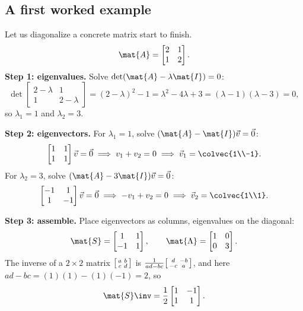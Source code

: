 \subsection{A first worked example}
\label{ch24:first-example}

Let us diagonalize a concrete matrix start to finish.
\[
  \mat{A} = \begin{bmatrix} 2 & 1 \\ 1 & 2 \end{bmatrix}.
\]
\textbf{Step 1: eigenvalues.} Solve $\det(\mat{A} - \lambda\mat{I}) = 0$:
\[
  \det\begin{bmatrix} 2-\lambda & 1 \\ 1 & 2-\lambda \end{bmatrix}
  = (2-\lambda)^2 - 1
  = \lambda^2 - 4\lambda + 3
  = (\lambda - 1)(\lambda - 3) = 0,
\]
so $\lambda_1 = 1$ and $\lambda_2 = 3$.

\textbf{Step 2: eigenvectors.} For $\lambda_1 = 1$, solve $(\mat{A}-\mat{I})\vec{v}=\vec0$:
\[
  \begin{bmatrix} 1 & 1 \\ 1 & 1 \end{bmatrix}\vec{v} = \vec0
  \;\Longrightarrow\; v_1 + v_2 = 0
  \;\Longrightarrow\; \vec{v}_1 = \colvec{1\\-1}.
\]
For $\lambda_2 = 3$, solve $(\mat{A}-3\mat{I})\vec{v}=\vec0$:
\[
  \begin{bmatrix} -1 & 1 \\ 1 & -1 \end{bmatrix}\vec{v} = \vec0
  \;\Longrightarrow\; -v_1 + v_2 = 0
  \;\Longrightarrow\; \vec{v}_2 = \colvec{1\\1}.
\]

\textbf{Step 3: assemble.} Place eigenvectors as columns, eigenvalues on the diagonal:
\[
  \mat{S} = \begin{bmatrix} 1 & 1 \\ -1 & 1 \end{bmatrix},
  \qquad
  \mat{\Lambda} = \begin{bmatrix} 1 & 0 \\ 0 & 3 \end{bmatrix}.
\]
The inverse of a $2\times2$ matrix $\begin{bsmallmatrix} a&b\\c&d\end{bsmallmatrix}$
is $\frac{1}{ad-bc}\begin{bsmallmatrix} d&-b\\-c&a\end{bsmallmatrix}$, and here
$ad-bc = (1)(1)-(1)(-1) = 2$, so
\[
  \mat{S}\inv = \frac{1}{2}\begin{bmatrix} 1 & -1 \\ 1 & 1 \end{bmatrix}.
\]

